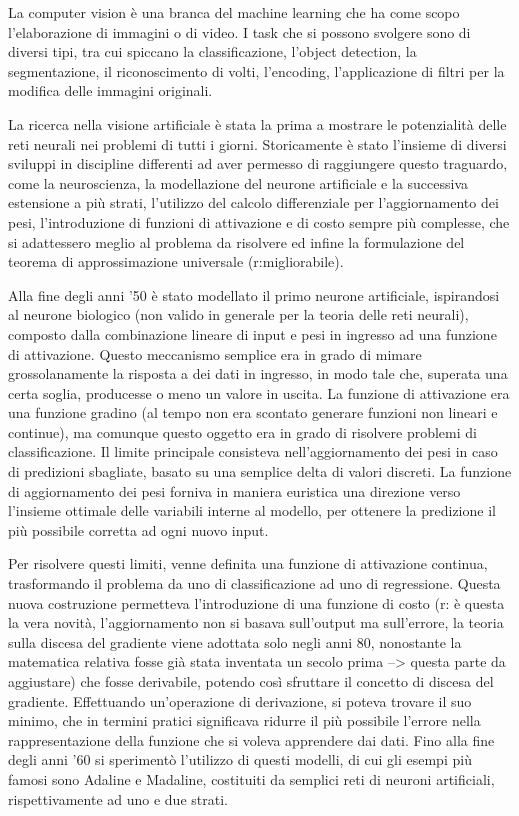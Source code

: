 \noindent La computer vision è una branca del machine learning che ha come scopo l'elaborazione di immagini o di video. I task che si possono svolgere sono di diversi tipi, tra cui spiccano la classificazione, l'object detection, la segmentazione, il riconoscimento di volti, l'encoding, l'applicazione di filtri per la modifica delle immagini originali.

La ricerca nella visione artificiale è stata la prima a mostrare le potenzialità delle reti neurali nei problemi di tutti i giorni. Storicamente è stato l'insieme di diversi sviluppi in discipline differenti ad aver permesso di raggiungere questo traguardo, come la neuroscienza, la modellazione del neurone artificiale e la successiva estensione a più strati, l'utilizzo del calcolo differenziale per l'aggiornamento dei pesi, l'introduzione di funzioni di attivazione e di costo sempre più complesse, che si adattessero meglio al problema da risolvere ed infine la formulazione del teorema di approssimazione universale (r:migliorabile). 

Alla fine degli anni '50 è stato modellato il primo neurone artificiale, ispirandosi al neurone biologico (non valido in generale per la teoria delle reti neurali), composto dalla combinazione lineare di input e pesi in ingresso ad una funzione di attivazione. Questo meccanismo semplice era in grado di mimare grossolanamente la risposta a dei dati in ingresso, in modo tale che, superata una certa soglia, producesse o meno un valore in uscita. La funzione di attivazione era una funzione gradino (al tempo non era scontato generare funzioni non lineari e continue), ma comunque questo oggetto era in grado di risolvere problemi di classificazione. Il limite principale consisteva nell'aggiornamento dei pesi in caso di predizioni sbagliate, basato su una semplice delta di valori discreti. La funzione di aggiornamento dei pesi forniva in maniera euristica una direzione verso l'insieme ottimale delle variabili interne al modello, per ottenere la predizione il più possibile corretta ad ogni nuovo input. 

Per risolvere questi limiti, venne definita una funzione di attivazione continua, trasformando il problema da uno di classificazione ad uno di regressione. Questa nuova costruzione permetteva l'introduzione di una funzione di costo (r: è questa la vera novità, l'aggiornamento non si basava sull'output ma sull'errore, la teoria sulla discesa del gradiente viene adottata solo negli anni 80, nonostante la matematica relativa fosse già stata inventata un secolo prima --> questa parte da aggiustare) che fosse derivabile, potendo così sfruttare il concetto di discesa del gradiente. Effettuando un'operazione di derivazione, si poteva trovare il suo minimo, che in termini pratici significava ridurre il più possibile l'errore nella rappresentazione della funzione che si voleva apprendere dai dati. Fino alla fine degli anni '60 si sperimentò l'utilizzo di questi modelli, di cui gli esempi più famosi sono Adaline e Madaline, costituiti da semplici reti di neuroni artificiali, rispettivamente ad uno e due strati. 


